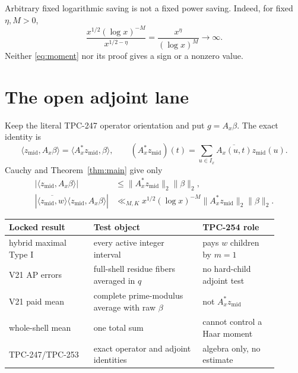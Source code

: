 \documentclass[10pt]{article}
\newcommand{\ip}[2]{\langle #1,#2\rangle}
\newcommand{\conj}[1]{\overline{#1}}
\newcommand{\zm}{z_{\mathrm{mid}}}
\newcommand{\Ax}{A_x}
\begin{document}
Arbitrary fixed logarithmic saving is not a fixed power saving.  Indeed, for
fixed $\eta,M>0$,
\begin{equation}
 \frac{x^{1/2}(\log x)^{-M}}{x^{1/2-\eta}}
 =\frac{x^\eta}{(\log x)^M}\longrightarrow\infty.       \label{eq:logpower}
\end{equation}
Neither \eqref{eq:moment} nor its proof gives a sign or a nonzero value.

\section{The open adjoint lane}

Keep the literal TPC-247 operator orientation and put $g=\Ax\beta$.  The
exact identity is
\begin{equation}
 \ip{\zm}{\Ax\beta}=\ip{\Ax^*\zm}\beta,\qquad
 (\Ax^*\zm)(t)=\sum_{u\in I_x}\conj{\Ax(u,t)}\zm(u).     \label{eq:adjoint}
\end{equation}
Cauchy and Theorem~\ref{thm:main} give only
\begin{align}
 |\ip{\zm}{\Ax\beta}|&\leq\|\Ax^*\zm\|_2\|\beta\|_2,             \label{eq:cauchy}\\
 |\conj{\ip{\zm}w}\ip{\zm}{\Ax\beta}|
 &\ll_{M,K}x^{1/2}(\log x)^{-M}\|\Ax^*\zm\|_2\|\beta\|_2.        \label{eq:transfer}
\end{align}

\begin{center}
\small
\begin{tabular}{>{\raggedright\arraybackslash}p{0.29\linewidth}
                >{\raggedright\arraybackslash}p{0.36\linewidth}
                >{\raggedright\arraybackslash}p{0.25\linewidth}}
\toprule
Locked result & Test object & TPC-254 role \\
\midrule
hybrid maximal Type I & every active integer interval & pays $w$ children by $m=1$ \\
V21 AP errors & full-shell residue fibers averaged in $q$ & no hard-child adjoint test \\
V21 paid mean & complete prime-modulus average with raw $\beta$ & not $\Ax^*\zm$ \\
whole-shell mean & one total sum & cannot control a Haar moment \\
TPC-247/TPC-253 & exact operator and adjoint identities & algebra only, no estimate \\
\bottomrule
\end{tabular}
\end{center}
\end{document}
